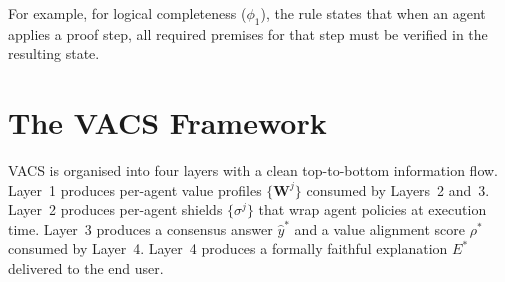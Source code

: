 \documentclass[12pt,a4paper]{article}
\newcommand{\bW}{\bm{W}}
\begin{document}
For example, for logical completeness ($\phi_1$), the rule states that when an agent
applies a proof step, all required premises for that step must be verified in the
resulting state.

\section{The VACS Framework}
\label{sec:framework}

VACS is organised into four layers with a clean top-to-bottom information flow.
Layer~1 produces per-agent value profiles $\{\bW^j\}$ consumed by Layers~2 and~3.
Layer~2 produces per-agent shields $\{\sigma^j\}$ that wrap agent policies at
execution time. Layer~3 produces a consensus answer $\hat{y}^*$ and a value alignment
score $\rho^*$ consumed by Layer~4. Layer~4 produces a formally faithful explanation
$E^*$ delivered to the end user.
\end{document}
